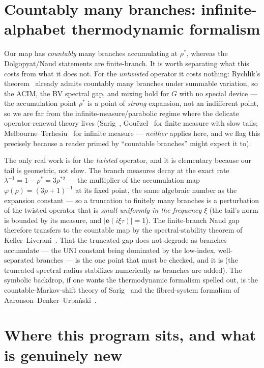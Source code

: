 \documentclass[11pt]{article}
\begin{document}
\section{Countably many branches: infinite-alphabet thermodynamic formalism}
\label{sec:infinite}

Our map has \emph{countably} many branches accumulating at $\rho^\ast$, whereas
the Dolgopyat/Naud statements are finite-branch. It is worth separating what
this costs from what it does not. For the \emph{untwisted} operator it costs
nothing: Rychlik's theorem~\cite{Rychlik1983} already admits countably many
branches under summable variation, so the ACIM, the BV spectral gap, and mixing
hold for $G$ with no special device --- the accumulation point $\rho^\ast$ is a
point of \emph{strong} expansion, not an indifferent point, so we are far from
the infinite-measure/parabolic regime where the delicate operator-renewal
theory lives (Sarig~\cite{Sarig2002}, Gou\"ezel~\cite{Gouezel2004} for finite
measure with slow tails; Melbourne--Terhesiu~\cite{MelbourneTerhesiu2012} for
infinite measure --- \emph{neither} applies here, and we flag this precisely
because a reader primed by ``countable branches'' might expect it to).

The only real work is for the \emph{twisted} operator, and it is elementary
because our tail is geometric, not slow. The branch measures decay at the exact
rate $\lambda^{-1}=1-\rho^\ast=3\rho^{\ast2}$ --- the multiplier of the
accumulation map $\varphi(\rho)=(3\rho+1)^{-1}$ at its fixed point, the same
algebraic number as the expansion constant --- so a truncation to finitely many
branches is a perturbation of the twisted operator that is \emph{small
uniformly in the frequency} $\xi$ (the tail's norm is bounded by its measure,
and $|\mathbf e(i\xi\tau)|=1$). The finite-branch Naud gap therefore transfers
to the countable map by the spectral-stability theorem of
Keller--Liverani~\cite{KellerLiverani1999}. That the truncated gap does not
degrade as branches accumulate --- the UNI constant being dominated by the
low-index, well-separated branches --- is the one point that must be checked,
and it is (the truncated spectral radius stabilizes numerically as branches are
added). The symbolic backdrop, if one wants the thermodynamic formalism spelled
out, is the countable-Markov-shift theory of Sarig~\cite{Sarig1999} and the
fibred-system formalism of Aaronson--Denker--Urba\'nski~\cite{ADU1993}.

\section{Where this program sits, and what is genuinely new}
\label{sec:new}
\end{document}
